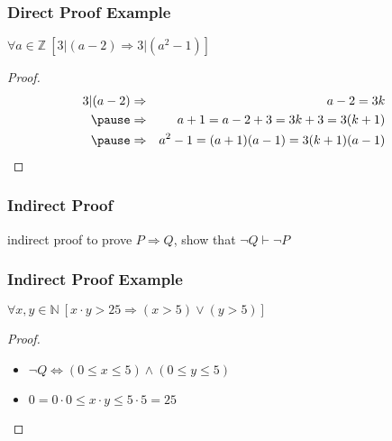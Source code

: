 \documentclass[dvipsnames]{beamer}
\begin{document}
\begin{frame}
  \frametitle{Direct Proof Example}

  \begin{theorem}
    $\forall a \in \mathbb{Z}~[3 | (a-2) \Rightarrow 3 | (a^2-1)]$
  \end{theorem}

  \pause
  \begin{proof}
    \begin{eqnarray*}
      3 | (a-2) & \Rightarrow & a-2 = 3k\\\pause
                & \Rightarrow & a+1 = a-2 + 3 = 3k+3 = 3(k+1)\\\pause
                & \Rightarrow & a^2-1 = (a+1)(a-1) = 3(k+1)(a-1)
    \end{eqnarray*}
  \end{proof}
\end{frame}

\begin{frame}
  \frametitle{Indirect Proof}

  \begin{block}{indirect proof}
    to prove $P \Rightarrow Q$, show that $\neg Q \vdash \neg P$
  \end{block}
\end{frame}

\begin{frame}
  \frametitle{Indirect Proof Example}

  \begin{theorem}
    $\forall x,y \in \mathbb{N}~[x \cdot y > 25
      \Rightarrow (x > 5) \vee (y > 5)]$
  \end{theorem}

  \pause
  \begin{proof}
    \begin{itemize}
      \item $\neg Q \Leftrightarrow (0 \leq x \leq 5) \wedge (0 \leq y \leq 5)$

      \pause
      \item $0 = 0 \cdot 0 \leq x \cdot y \leq 5 \cdot 5 = 25$
    \end{itemize}
  \end{proof}
\end{frame}
\end{document}
